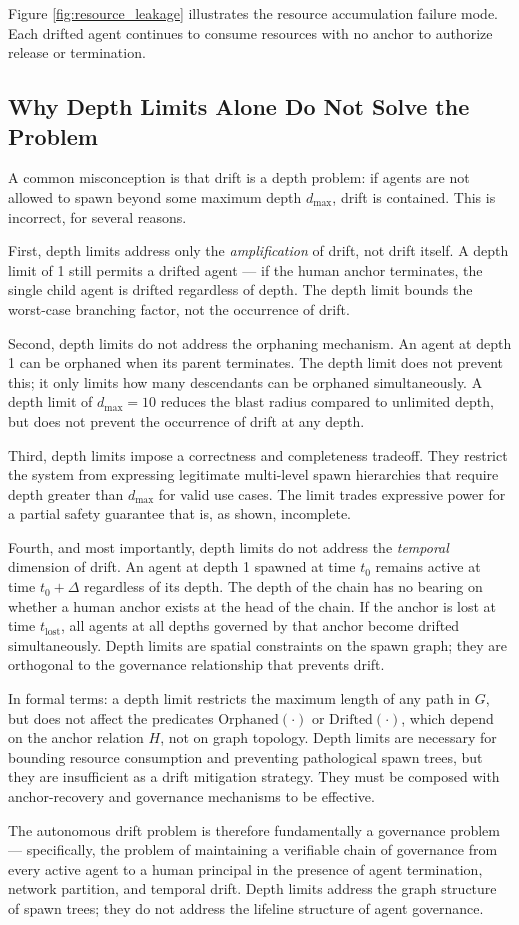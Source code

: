 Figure \ref{fig:resource_leakage} illustrates the resource accumulation failure mode. Each drifted agent continues to consume resources with no anchor to authorize release or termination.

\subsection{Why Depth Limits Alone Do Not Solve the Problem}

A common misconception is that drift is a depth problem: if agents are not allowed to spawn beyond some maximum depth $d_{\max}$, drift is contained. This is incorrect, for several reasons.

First, depth limits address only the \textit{amplification} of drift, not drift itself. A depth limit of 1 still permits a drifted agent — if the human anchor terminates, the single child agent is drifted regardless of depth. The depth limit bounds the worst-case branching factor, not the occurrence of drift.

Second, depth limits do not address the orphaning mechanism. An agent at depth 1 can be orphaned when its parent terminates. The depth limit does not prevent this; it only limits how many descendants can be orphaned simultaneously. A depth limit of $d_{\max} = 10$ reduces the blast radius compared to unlimited depth, but does not prevent the occurrence of drift at any depth.

Third, depth limits impose a correctness and completeness tradeoff. They restrict the system from expressing legitimate multi-level spawn hierarchies that require depth greater than $d_{\max}$ for valid use cases. The limit trades expressive power for a partial safety guarantee that is, as shown, incomplete.

Fourth, and most importantly, depth limits do not address the \textit{temporal} dimension of drift. An agent at depth 1 spawned at time $t_0$ remains active at time $t_0 + \Delta$ regardless of its depth. The depth of the chain has no bearing on whether a human anchor exists at the head of the chain. If the anchor is lost at time $t_{\text{lost}}$, all agents at all depths governed by that anchor become drifted simultaneously. Depth limits are spatial constraints on the spawn graph; they are orthogonal to the governance relationship that prevents drift.

In formal terms: a depth limit restricts the maximum length of any path in $G$, but does not affect the predicates $\text{Orphaned}(\cdot)$ or $\text{Drifted}(\cdot)$, which depend on the anchor relation $H$, not on graph topology. Depth limits are necessary for bounding resource consumption and preventing pathological spawn trees, but they are insufficient as a drift mitigation strategy. They must be composed with anchor-recovery and governance mechanisms to be effective.

The autonomous drift problem is therefore fundamentally a governance problem — specifically, the problem of maintaining a verifiable chain of governance from every active agent to a human principal in the presence of agent termination, network partition, and temporal drift. Depth limits address the graph structure of spawn trees; they do not address the lifeline structure of agent governance.